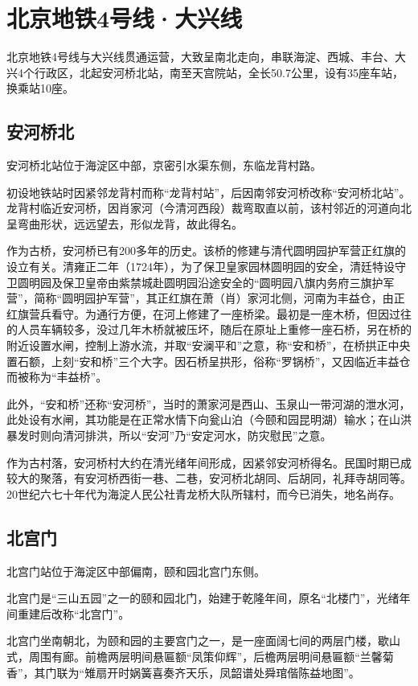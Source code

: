\chapter{北京地铁4号线·大兴线}
\begin{epigraph}
    北京地铁4号线与大兴线贯通运营，大致呈南北走向，串联海淀、西城、丰台、大兴4个行政区，北起安河桥北站，南至天宫院站，全长50.7公里，设有35座车站，换乘站10座。
\end{epigraph}

\section{安河桥北}
安河桥北站位于海淀区中部，京密引水渠东侧，东临龙背村路。

初设地铁站时因紧邻龙背村而称“龙背村站”，后因南邻安河桥改称“安河桥北站”。龙背村临近安河桥，因肖家河（今清河西段）裁弯取直以前，该村邻近的河道向北呈弯曲形状，远远望去，形似龙背，故此得名。

作为古桥，安河桥已有200多年的历史。该桥的修建与清代圆明园护军营正红旗的设立有关。清雍正二年（1724年），为了保卫皇家园林圆明园的安全，清廷特设守卫圆明园及保卫皇帝由紫禁城赴圆明园沿途安全的“圆明园八旗内务府三旗护军营”，简称“圆明园护军营”，其正红旗在萧（肖）家河北侧，河南为丰益仓，由正红旗营兵看守。为通行方便，在河上修建了一座桥梁。最初是一座木桥，但因过往的人员车辆较多，没过几年木桥就被压坏，随后在原址上重修一座石桥，另在桥的附近设置水闸，控制上游水流，并取“安澜平和”之意，称“安和桥”，在桥拱正中央置石额，上刻“安和桥”三个大字。因石桥呈拱形，俗称“罗锅桥”，又因临近丰益仓而被称为“丰益桥”。

此外，“安和桥”还称“安河桥”，当时的萧家河是西山、玉泉山一带河湖的泄水河，此处设有水闸，其功能是在正常水情下向瓮山泊（今颐和园昆明湖）输水；在山洪暴发时则向清河排洪，所以“安河”乃“安定河水，防灾慰民”之意。

作为古村落，安河桥村大约在清光绪年间形成，因紧邻安河桥得名。民国时期已成较大的聚落，有安河桥西街一巷、二巷，安河桥北胡同、后胡同，礼拜寺胡同等。20世纪六七十年代为海淀人民公社青龙桥大队所辖村，而今已消失，地名尚存。

\section{北宫门}
北宫门站位于海淀区中部偏南，颐和园北宫门东侧。

北宫门是“三山五园”之一的颐和园北门，始建于乾隆年间，原名“北楼门”，光绪年间重建后改称“北宫门”。

北宫门坐南朝北，为颐和园的主要宫门之一，是一座面阔七间的两层门楼，歇山式，周围有廊。前檐两层明间悬匾额“凤策仰辉”，后檐两层明间悬匾额“兰馨菊香”，其门联为“雉扇开时娲簧喜奏齐天乐，凤韶谱处舜琯偕陈益地图”。

